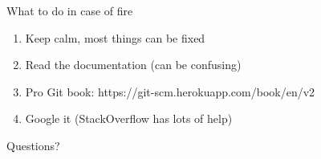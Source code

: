 \documentclass{beamer}
\begin{document}
\begin{frame}{What to do in case of fire}
  \begin{enumerate}
    \item Keep calm, most things can be fixed
    \item Read the documentation (can be confusing)
    \item Pro Git book: https://git-scm.herokuapp.com/book/en/v2
    \item Google it (StackOverflow has lots of help)
  \end{enumerate}
\end{frame}

\begin{frame}{}
  \center
  \Huge Questions?
\end{frame}
\end{document}
